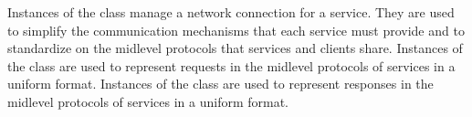 Instances of the  class manage a \yarp{} network connection
for a service.
They are used to simplify the communication mechanisms that each service must provide and
to standardize on the mid\longDash{}level protocols that \mplusm{} services and clients
share.
Instances of the  class are used to represent requests
in the mid\longDash{}level protocols of \mplusm{} services in a uniform format.
Instances of the  class are used to represent
responses in the mid\longDash{}level protocols of \mplusm{} services in a uniform format.
\primaryEnd{}
